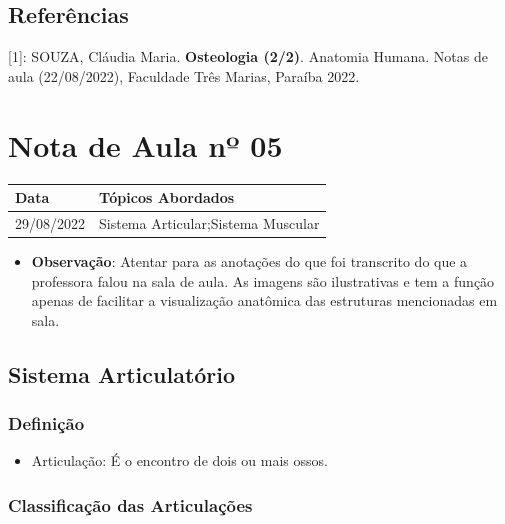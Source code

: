 \documentclass[
]{book}
\providecommand{\tightlist}{%
  \setlength{\itemsep}{0pt}\setlength{\parskip}{0pt}}
\begin{document}
\hypertarget{referuxeancias-2}{%
\subsection{Referências}\label{referuxeancias-2}}

{[}1{]}: SOUZA, Cláudia Maria. \textbf{Osteologia (2/2)}. Anatomia Humana. Notas de aula (22/08/2022), Faculdade Três Marias, Paraíba 2022.

\hypertarget{nota-de-aula-nuxba-05}{%
\section{Nota de Aula nº 05}\label{nota-de-aula-nuxba-05}}

\begin{longtable}[]{@{}ll@{}}
\toprule()
Data & Tópicos Abordados \\
\midrule()
\endhead
29/08/2022 & Sistema Articular;Sistema Muscular \\
\bottomrule()
\end{longtable}

\begin{itemize}
\tightlist
\item
  \textbf{Observação}: Atentar para as anotações do que foi transcrito do que a professora falou na sala de aula. As imagens são ilustrativas e tem a função apenas de facilitar a visualização anatômica das estruturas mencionadas em sala.
\end{itemize}

\hypertarget{sistema-articulatuxf3rio}{%
\subsection{Sistema Articulatório}\label{sistema-articulatuxf3rio}}

\hypertarget{definiuxe7uxe3o}{%
\subsubsection{Definição}\label{definiuxe7uxe3o}}

\begin{itemize}
\tightlist
\item
  Articulação: É o encontro de dois ou mais ossos.
\end{itemize}

\hypertarget{classificauxe7uxe3o-das-articulauxe7uxf5es}{%
\subsubsection{Classificação das Articulações}\label{classificauxe7uxe3o-das-articulauxe7uxf5es}}
\end{document}
